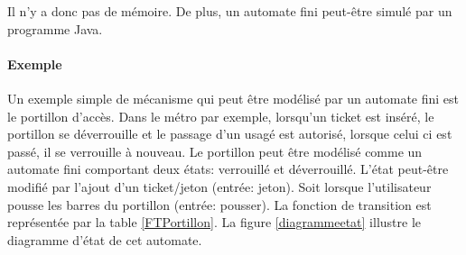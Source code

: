 \begin{myrem}
	Il n'y a donc pas de mémoire. De plus, un automate fini peut-être simulé
	par un programme Java.
\end{myrem}

%
%
%

\paragraph{Exemple}
Un exemple simple de mécanisme qui peut être modélisé par un automate fini est le portillon d'accès. Dans le métro par exemple, lorsqu'un ticket est inséré, le portillon se déverrouille et le passage d'un usagé est autorisé, lorsque celui ci est passé, il se verrouille à nouveau. Le portillon peut être modélisé comme un automate fini comportant deux états: verrouillé et déverrouillé. L'état peut-être modifié par l'ajout d'un ticket/jeton (entrée: jeton). Soit lorsque l'utilisateur pousse les barres du portillon (entrée: pousser). La fonction de transition est représentée par la table \ref{FTPortillon}. La figure \ref{diagrammeetat} illustre le diagramme d'état de cet automate.


